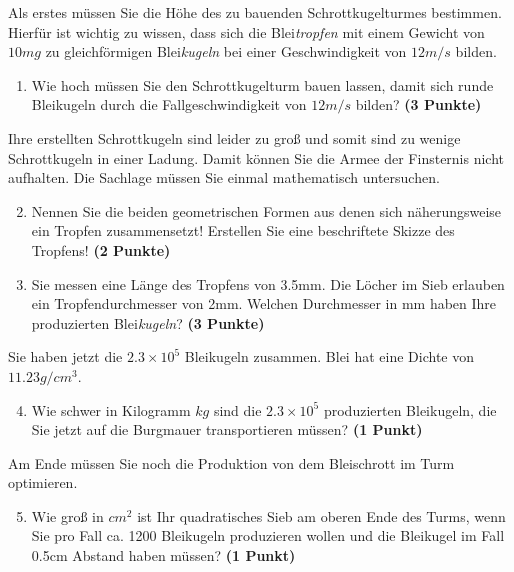 \documentclass[a4paper, 9pt]{scrartcl}\usepackage[]{graphicx}\usepackage[]{xcolor}
\begin{document}
Als erstes m{\"u}ssen Sie die H{\"o}he des zu bauenden Schrottkugelturmes
bestimmen. Hierf{\"u}r ist wichtig zu wissen, dass sich die
Blei\textit{tropfen} mit einem Gewicht von $10mg$ zu
gleichf{\"o}rmigen Blei\textit{kugeln} bei einer Geschwindigkeit von
$12m/s$ bilden.

\begin{enumerate}
\item Wie hoch m{\"u}ssen Sie den Schrottkugelturm bauen lassen, damit sich
  runde Bleikugeln durch die Fallgeschwindigkeit von $12m/s$ bilden?
  \textbf{(3 Punkte)}
\end{enumerate}

Ihre erstellten Schrottkugeln sind leider zu gro{\ss} und somit sind zu wenige
Schrottkugeln in einer Ladung. Damit k{\"o}nnen Sie die Armee der Finsternis
nicht aufhalten. Die Sachlage m{\"u}ssen Sie einmal mathematisch untersuchen.

\begin{enumerate}
  \setcounter{enumi}{1}
\item Nennen Sie die beiden geometrischen Formen aus denen sich
  n{\"a}herungsweise ein Tropfen zusammensetzt! Erstellen Sie eine beschriftete 
  Skizze des Tropfens!
  \textbf{(2 Punkte)}
\item Sie messen eine L{\"a}nge des Tropfens von 3.5mm. Die L{\"o}cher
  im Sieb erlauben ein Tropfendurchmesser von 2mm. Welchen
  Durchmesser in mm haben Ihre produzierten Blei\textit{kugeln}?  \textbf{(3 Punkte)}
\end{enumerate}

Sie haben jetzt die \ensuremath{2.3\times 10^{5}} Bleikugeln zusammen. Blei hat eine Dichte
von $11.23g/cm^3$.

\begin{enumerate}
  \setcounter{enumi}{3}
\item Wie schwer in Kilogramm $kg$ sind die \ensuremath{2.3\times 10^{5}} produzierten
  Bleikugeln, die Sie jetzt auf die Burgmauer transportieren m{\"u}ssen?
  \textbf{(1 Punkt)}
\end{enumerate}

Am Ende m{\"u}ssen Sie noch die Produktion von dem Bleischrott im Turm optimieren.

\begin{enumerate}
  \setcounter{enumi}{4}
\item Wie gro{\ss} in $cm^2$ ist Ihr quadratisches Sieb am oberen Ende des Turms,
  wenn Sie pro Fall ca. 1200 Bleikugeln produzieren wollen und
  die Bleikugel im Fall 0.5cm Abstand haben m{\"u}ssen?  \textbf{(1
    Punkt)}
\end{enumerate}
 
\end{document}
